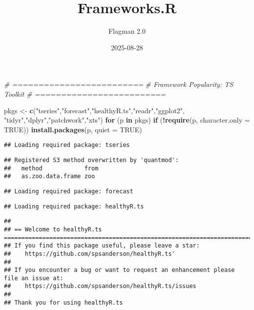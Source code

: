 \documentclass[
]{article}
\title{Frameworks.R}
\author{Flagman 2.0}
\date{2025-08-28}
\newenvironment{Shaded}{\begin{snugshade}}{\end{snugshade}}
\newcommand{\AttributeTok}[1]{\textcolor[rgb]{0.13,0.29,0.53}{#1}}
\newcommand{\CommentTok}[1]{\textcolor[rgb]{0.56,0.35,0.01}{\textit{#1}}}
\newcommand{\ConstantTok}[1]{\textcolor[rgb]{0.56,0.35,0.01}{#1}}
\newcommand{\ControlFlowTok}[1]{\textcolor[rgb]{0.13,0.29,0.53}{\textbf{#1}}}
\newcommand{\FunctionTok}[1]{\textcolor[rgb]{0.13,0.29,0.53}{\textbf{#1}}}
\newcommand{\NormalTok}[1]{#1}
\newcommand{\OtherTok}[1]{\textcolor[rgb]{0.56,0.35,0.01}{#1}}
\newcommand{\SpecialCharTok}[1]{\textcolor[rgb]{0.81,0.36,0.00}{\textbf{#1}}}
\newcommand{\StringTok}[1]{\textcolor[rgb]{0.31,0.60,0.02}{#1}}
\begin{document}
\maketitle

\begin{Shaded}
\begin{Highlighting}[]
\CommentTok{\# =========================}
\CommentTok{\# Framework Popularity: TS Toolkit}
\CommentTok{\# =========================}
\end{Highlighting}
\end{Shaded}

\begin{Shaded}
\begin{Highlighting}[]
\NormalTok{pkgs }\OtherTok{\textless{}{-}} \FunctionTok{c}\NormalTok{(}\StringTok{"tseries"}\NormalTok{,}\StringTok{"forecast"}\NormalTok{,}\StringTok{"healthyR.ts"}\NormalTok{,}\StringTok{"readr"}\NormalTok{,}\StringTok{"ggplot2"}\NormalTok{,}
          \StringTok{"tidyr"}\NormalTok{,}\StringTok{"dplyr"}\NormalTok{,}\StringTok{"patchwork"}\NormalTok{,}\StringTok{"xts"}\NormalTok{)}
\ControlFlowTok{for}\NormalTok{ (p }\ControlFlowTok{in}\NormalTok{ pkgs) }\ControlFlowTok{if}\NormalTok{ (}\SpecialCharTok{!}\FunctionTok{require}\NormalTok{(p, }\AttributeTok{character.only =} \ConstantTok{TRUE}\NormalTok{)) }\FunctionTok{install.packages}\NormalTok{(p, }\AttributeTok{quiet =} \ConstantTok{TRUE}\NormalTok{)}
\end{Highlighting}
\end{Shaded}

\begin{verbatim}
## Loading required package: tseries
\end{verbatim}

\begin{verbatim}
## Registered S3 method overwritten by 'quantmod':
##   method            from
##   as.zoo.data.frame zoo
\end{verbatim}

\begin{verbatim}
## Loading required package: forecast
\end{verbatim}

\begin{verbatim}
## Loading required package: healthyR.ts
\end{verbatim}

\begin{verbatim}
## 
## == Welcome to healthyR.ts ===========================================================================
## If you find this package useful, please leave a star: 
##    https://github.com/spsanderson/healthyR.ts'
## 
## If you encounter a bug or want to request an enhancement please file an issue at:
##    https://github.com/spsanderson/healthyR.ts/issues
## 
## Thank you for using healthyR.ts
\end{verbatim}
\end{document}
